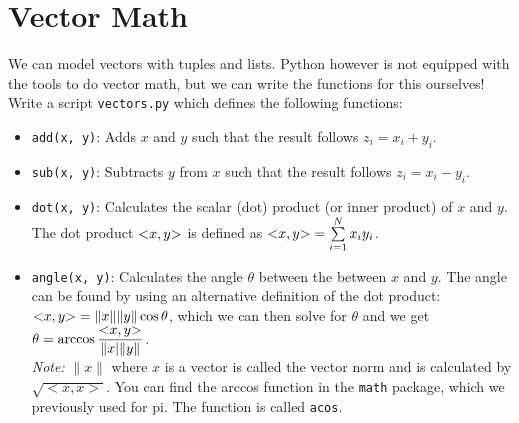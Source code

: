 \section{Vector Math}
We can model vectors with tuples and lists. Python however is not equipped with the tools to do vector math, but we can write the functions for this ourselves!\\
Write a script \texttt{vectors.py} which defines the following functions:
\begin{itemize}
  \item \texttt{add(x, y)}: Adds $x$ and $y$ such that the result follows $z_i = x_i + y_i$.
    \cprotect{}
  \item \texttt{sub(x, y)}: Subtracts $y$ from $x$ such that the result follows $z_i = x_i - y_i$.
    \cprotect{}
  \item \texttt{dot(x, y)}: Calculates the scalar (dot) product (or inner product) of $x$ and $y$. The dot product $\small{<} x,y\small{>}$ is defined as $\small{<} x,y\small{>} = \sum\limits_{i=1}^{N}x_iy_i$.
\cprotect{}
  \item \texttt{angle(x, y)}: Calculates the angle $\theta$ between the between $x$ and $y$. The angle can be found by using an alternative definition of the dot product: $\small{<} x,y\small{>} = \|x\|\|y\| \cos\theta$, which we can then solve for $\theta$ and we get $\theta = \arccos\dfrac{\small{<} x,y\small{>}}{\|x|\|y\|}$.\\
  \emph{Note:} $\|x\|$ where $x$ is a vector is called the vector norm and is calculated by $\sqrt{<x,x>}$. You can find the arccos function in the \texttt{math} package, which we previously used for pi. The function is called \texttt{acos}.
\cprotect{}
\end{itemize}
